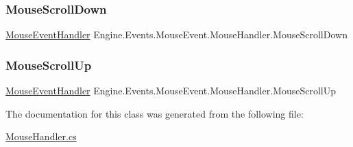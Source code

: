 \subsubsection{\texorpdfstring{Mouse\+Scroll\+Down}{MouseScrollDown}}
{\footnotesize\ttfamily \hyperlink{a00378_a932e0a6ed83094bb6fa33a6ae64be38a}{Mouse\+Event\+Handler} Engine.\+Events.\+Mouse\+Event.\+Mouse\+Handler.\+Mouse\+Scroll\+Down}

\mbox{\label{a00378_aa534e523c05b4c0eb558a62e932c063a}} 
\subsubsection{\texorpdfstring{Mouse\+Scroll\+Up}{MouseScrollUp}}
{\footnotesize\ttfamily \hyperlink{a00378_a932e0a6ed83094bb6fa33a6ae64be38a}{Mouse\+Event\+Handler} Engine.\+Events.\+Mouse\+Event.\+Mouse\+Handler.\+Mouse\+Scroll\+Up}



The documentation for this class was generated from the following file\+:\begin{DoxyCompactItemize}
\item 
\hyperlink{a00065}{Mouse\+Handler.\+cs}\end{DoxyCompactItemize}

